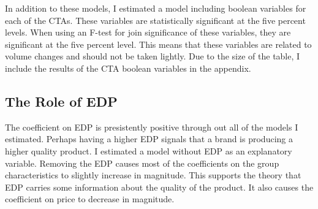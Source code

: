 \documentclass{article}
\begin{document}
In addition to these models, I estimated a model including boolean variables for each of the CTAs. These variables are statistically significant at the five percent levels. When using an F-test for join significance of these variables, they are significant at the five percent level. This means that these variables are related to volume changes and should not be taken lightly. Due to the size of the table, I include the results of the CTA boolean variables in the appendix.

\subsection{The Role of EDP}

The coefficient on EDP is presistently positive through out all of the models I estimated. Perhaps having a higher EDP signals that a brand is producing a higher quality product. I estimated a model without EDP as an explanatory variable. Removing the EDP causes most of the coefficients on the group characteristics to slightly increase in magnitude. This supports the theory that EDP carries some information about the quality of the product. It also causes the coefficient on price to decrease in magnitude.
\end{document}
